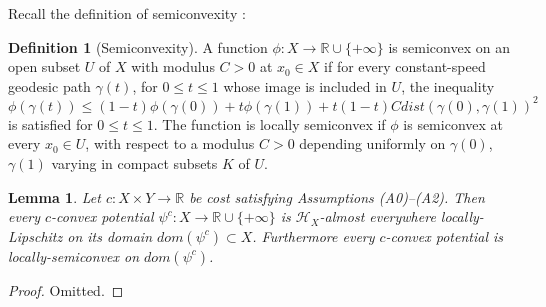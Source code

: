 \documentclass[12pt]{amsart}
\newtheorem{lem}{Lemma}
\theoremstyle{definition}
\newtheorem{dfn}{Definition}
\theoremstyle{remark}
\newcommand{\bR}{\mathbb{R}}
\newcommand{\del}{\partial}
\begin{document}
Recall the definition of semiconvexity \cite[Definition 10.10, pp.228]{Vil1}: 
\begin{dfn}[Semiconvexity]
A function $\phi: X \to \bR \cup \{+\infty\}$ is semiconvex on an open subset $U$ of $X$ with modulus $C>0$ at $x_0\in X$ if for every constant-speed geodesic path $\gamma(t)$, for $0\leq t\leq 1$ whose image is included in $U$, the inequality 
\begin{equation}\phi(\gamma(t)) \leq (1-t) \phi(\gamma(0)) +t \phi(\gamma(1)) +t(1-t) C dist(\gamma(0), \gamma(1))^2 \label{scineq} 
\end{equation} is satisfied for $0\leq t \leq 1$.
The function is locally semiconvex if $\phi$ is semiconvex at every $x_0\in U$, with respect to a modulus $C>0$ depending uniformly on $\gamma(0)$, $\gamma(1)$ varying in compact subsets $K$ of $U$. 
\end{dfn}



\begin{lem}\label{lip2}
Let $c: X\times Y \to \bR$ be cost satisfying Assumptions (A0)--(A2). Then every $c$-convex potential $\psi^c: X\to \bR \cup \{+\infty\}$ is $\mathscr{H}_X$-almost everywhere locally-Lipschitz on its domain $dom(\psi^c) \subset X$. Furthermore every $c$-convex potential is locally-semiconvex on $dom(\psi^c)$. 
\end{lem}
\begin{proof}
Omitted.
\end{proof}





\end{document}
